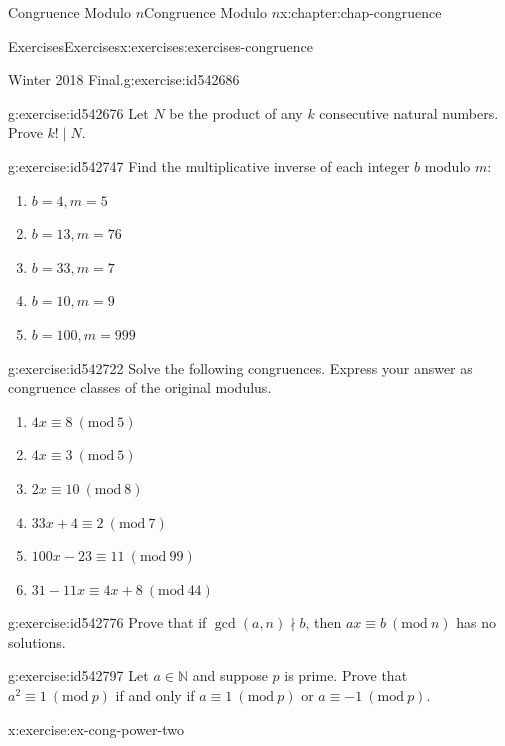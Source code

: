 \documentclass[oneside,10pt,]{book}
\numberwithin{equation}{section}
\newcommand{\Mod}[1]{\ \left(\mathrm{mod}\ #1\right)}
\begin{document}
\begin{chapterptx}{Congruence Modulo \(n\)}{}{Congruence Modulo \(n\)}{}{}{x:chapter:chap-congruence}
\begin{exercises-section}{Exercises}{}{Exercises}{}{}{x:exercises:exercises-congruence}
\begin{divisionexercise}{8}{Winter 2018 Final.}{}{g:exercise:id542686}
\end{divisionexercise}%
\begin{divisionexercise}{9}{}{}{g:exercise:id542676}%
Let \(N\) be the product of any \(k\) consecutive natural numbers. Prove \(k! \mid N\).%
\end{divisionexercise}%
\begin{divisionexercise}{10}{}{}{g:exercise:id542747}%
Find the multiplicative inverse of each integer \(b\) modulo \(m\):%
\begin{enumerate}[label=(\alph*)]
\item{}\(\displaystyle b = 4, m = 5\)%
\item{}\(\displaystyle b = 13, m = 76\)%
\item{}\(\displaystyle b = 33, m = 7\)%
\item{}\(\displaystyle b = 10, m = 9\)%
\item{}\(\displaystyle b = 100, m = 999\)%
\end{enumerate}
%
\end{divisionexercise}%
\begin{divisionexercise}{11}{}{}{g:exercise:id542722}%
Solve the following congruences. Express your answer as congruence classes of the original modulus.%
\begin{enumerate}[label=(\alph*)]
\item{}\(\displaystyle 4x \equiv 8 \Mod{5}\)%
\item{}\(\displaystyle 4x \equiv 3 \Mod{5}\)%
\item{}\(\displaystyle 2x \equiv 10 \Mod{8}\)%
\item{}\(\displaystyle 33x + 4 \equiv 2 \Mod{7}\)%
\item{}\(\displaystyle 100x - 23 \equiv 11 \Mod{99}\)%
\item{}\(\displaystyle 31 - 11x \equiv 4x + 8 \Mod{44}\)%
\end{enumerate}
%
\end{divisionexercise}%
\begin{divisionexercise}{12}{}{}{g:exercise:id542776}%
Prove that if \(\gcd(a,n) \nmid b\), then \(ax \equiv b \Mod{n}\) has no solutions.%
\end{divisionexercise}%
\begin{divisionexercise}{13}{}{}{g:exercise:id542797}%
Let \(a \in \mathbb{N}\) and suppose \(p\) is prime. Prove that \(a^2 \equiv 1 \Mod{p}\) if and only if \(a \equiv 1 \Mod{p}\) or \(a \equiv -1 \Mod{p}\).%
\end{divisionexercise}%
\begin{divisionexercise}{14}{}{}{x:exercise:ex-cong-power-two}%

\end{divisionexercise}
\end{exercises-section}
\end{chapterptx}
\end{document}
